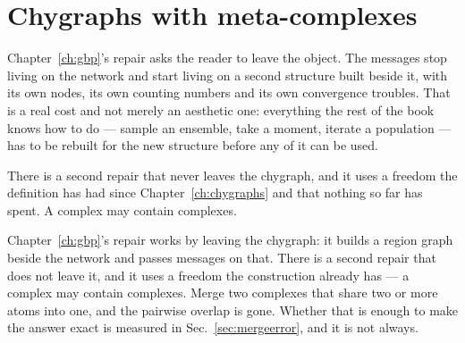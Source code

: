 \chapter{Chygraphs with meta-complexes}
\label{ch:metacomplex}

Chapter~\ref{ch:gbp}'s repair asks the reader to leave the object. The messages
stop living on the network and start living on a second structure built beside
it, with its own nodes, its own counting numbers and its own convergence
troubles. That is a real cost and not merely an aesthetic one: everything the
rest of the book knows how to do --- sample an ensemble, take a moment, iterate
a population --- has to be rebuilt for the new structure before any of it can be
used.

There is a second repair that never leaves the chygraph, and it uses a freedom
the definition has had since Chapter~\ref{ch:chygraphs} and that nothing so far
has spent. A complex may contain complexes.

Chapter~\ref{ch:gbp}'s repair works by leaving the chygraph: it builds a region
graph beside the network and passes messages on that. There is a second repair
that does not leave it, and it uses a freedom the construction already has ---
a complex may contain complexes. Merge two complexes that share two or more
atoms into one, and the pairwise overlap is gone. Whether that is enough to
make the answer exact is measured in Sec.~\ref{sec:mergeerror}, and it is not
always.

